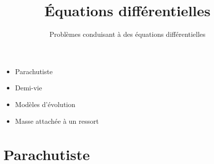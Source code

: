 








\title{{\bf \'Equations différentielles}}
\subtitle{Problèmes conduisant à des équations différentielles}

\begin{frame}
  
  \debutmontitre

  \pause

{\footnotesize
\hfill
{}
\begin{minipage}{0.6\textwidth}
  \begin{itemize}
    \item<3-> Parachutiste
    \item<4-> Demi-vie
    \item<5-> Modèles d'évolution
    \item<6-> Masse attachée à un ressort
  \end{itemize}
\end{minipage}
}

\end{frame}

\setcounter{framenumber}{0}

\section*{Parachutiste}

